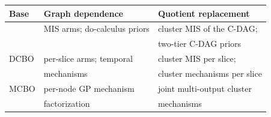 \begin{tabular}{@{}lll@{}}
\toprule
Base & Graph dependence & Quotient replacement \\
\midrule
\CBO{}  & MIS arms; do-calculus priors & cluster MIS of the C-DAG; \\
        &                              & \quad two-tier C-DAG priors \\
\addlinespace[2pt]
DCBO    & per-slice arms; temporal     & cluster MIS per slice; \\
        & \quad mechanisms             & \quad cluster mechanisms per slice \\
\addlinespace[2pt]
MCBO    & per-node GP mechanism        & joint multi-output cluster \\
        & \quad factorization          & \quad mechanisms \\
\bottomrule
\end{tabular}
